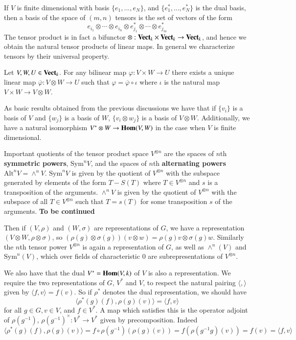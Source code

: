 If $V$ is finite dimensional with basis $\{e_1,...,e_N\}$, and $\{e_1^*,...,e_N^*\}$ is the dual basis, then a basis of the space of $(m,n)$ tensors is the set of vectors of the form \begin{equation*}
    e_{i_1}\otimes\cdots \otimes e_{i_n}\otimes e_{j_1}^*\otimes \cdots \otimes e_{j_m}^*
\end{equation*}
The tensor product is in fact a bifunctor $\otimes:\normalfont\textbf{Vect}_{k}\times \normalfont\textbf{Vect}_{k}\rightarrow \normalfont\textbf{Vect}_{k}$, and hence we obtain the natural tensor products of linear maps. In general we characterize tensors by their universal property.

\begin{theorem}
    Let $V,W,U \in \normalfont\textbf{Vect}_{k}$. For any bilinear map $\varphi:V\times W\rightarrow U$ there exists a unique linear map $\overline{\varphi}:V\otimes W\rightarrow U$ such that $\varphi = \overline{\varphi}\circ \iota$ where $\iota$ is the natural map $V\times W\rightarrow V\otimes W$.
\end{theorem}

As basic results obtained from the previous discussions we have that if $\{v_i\}$ is a basis of $V$ and $\{w_j\}$ is a basis of $W$, $\{v_i\otimes w_j\}$ is a basis of $V\otimes W$. Additionally, we have a natural isomorphism $V^*\otimes W\rightarrow \mathbf{Hom}(V,W)$ in the case when $V$ is finite dimensional.

Important quotients of the tensor product space $V^{\otimes n}$ are the spaces of $n$th \textbf{symmetric powers}, $\text{Sym}^nV$, and the spaces of $n$th \textbf{alternating powers} $\text{Alt}^nV = \wedge^nV$. $\text{Sym}^nV$ is given by the quotient of $V^{\otimes n}$ with the subspace generated by elements of the form $T-S(T)$ where $ T \in V^{\otimes n}$ and $s$ is a transposition of the arguments. $\wedge^nV$ is given by the quotient of $V^{\otimes n}$ with the subspace of all $T \in V^{\otimes n}$ such that $T = s(T)$ for some transposition $s$ of the arguments.
\textbf{To be continued}

Then if $(V,\rho)$ and $(W,\sigma)$ are representations of $G$, we have a representation $(V\otimes W, \rho\otimes \sigma)$, so $(\rho(g)\otimes \sigma(g))(v\otimes w) = \rho(g)v\otimes \sigma(g)w$. Similarly the $n$th tensor power $V^{\otimes n}$ is again a representation of $G$, as well as $\wedge^n(V)$ and $\text{Sym}^n(V)$, which over fields of characteristic $0$ are subrepresentations of $V^{\otimes n}$.

We also have that the dual $V^* = \mathbf{Hom}(V,k)$ of $V$ is also a representation. We require the two representations of $G$, $V^*$ and $V$, to respect the natural pairing $\langle ,\rangle$ given by $\langle f,v\rangle = f(v)$. So if $\rho^*$ denotes the dual representation, we should have $$\langle \rho^*(g)(f),\rho(g)(v)\rangle = \langle f,v\rangle$$
for all $g \in G,v \in V$, and $f \in V^*$. A map which satisfies this is the operator adjoint of $\rho(g^{-1})$, $\rho(g^{-1})^{\times}:V^*\rightarrow V^*$ given by precomposition. Indeed \begin{equation*}
    \langle \rho^*(g)(f),\rho(g)(v)\rangle = f\circ \rho(g^{-1})(\rho(g)(v)) = f(\rho(g^{-1}g)(v)) = f(v) = \langle f,v\rangle
\end{equation*}

